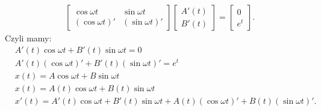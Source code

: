\documentclass[../main.tex]{subfiles}
\begin{document}
\begin{przyklad}
\begin{align*}
                &\begin{bmatrix} \cos\omega t& \sin\omega t\\ \left( \cos\omega t \right) ' & \left( \sin\omega t \right) '  \end{bmatrix} \begin{bmatrix} A'(t)\\B'(t) \end{bmatrix} = \begin{bmatrix} 0\\e^t \end{bmatrix}
            .\end{align*}
            Czyli mamy:
            \begin{align*}
                &A'(t) \cos\omega t + B'(t) \sin\omega t = 0\\
                &A'(t) \left( \cos\omega t \right) ' + B'(t) \left( \sin\omega t \right) ' = e^t\\
                &x(t) = A \cos\omega t+ B\sin\omega t\\
                &x(t) = A(t) \cos\omega t + B(t) \sin\omega t\\
                &x'(t) = A'(t) \cos\omega t+ B'(t) \sin\omega t + A(t) \left( \cos\omega t \right) ' + B(t)\left( \sin\omega t \right) '
            .\end{align*}
        \end{przyklad}
\end{document}
